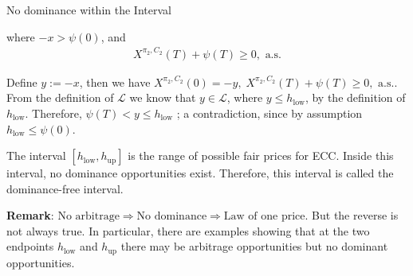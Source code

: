 \documentclass{beamer}
\begin{document}
\begin{frame}{No dominance within the Interval}

    {\footnotesize \footnotesize
    \par where $-x > \psi(0)$, and
    \begin{align*}
        X^{\pi_2, C_2}(T) + \psi(T) \geq 0, \text{ a.s.}
    \end{align*}
    \par Define $y := -x$, then we have $ X^{\pi_2, C_2}(0) = -y, \; X^{\pi_2, C_2}(T) + \psi(T) \geq 0, \text{ a.s.}$. 
    From the definition of $\mathcal{L}$ we know that $y \in \mathcal{L}$, 
    where $y \leq h_{\text{low}}$, by the definition of $h_{\text{low}}$. Therefore, $\psi(T) < y \leq h_{\text{low}}$
    ; a contradiction, since by assumption $h_{\text{low}} \leq \psi(0)$.
    \vspace{1em}
    \par The interval $[h_{\text{low}}, h_{\text{up}}]$ is the  range of possible fair prices  for ECC. 
    Inside this interval, no dominance opportunities exist. Therefore, this interval is called the dominance-free interval.
    \vspace{1em}
    \par \textbf{Remark}: $\text{No arbitrage} \Rightarrow \text{No dominance} \Rightarrow \text{Law of one price}$.
    But the reverse is not always true. In particular, 
    there are examples showing that at the two endpoints $h_{\text{low}}$ and $h_{\text{up}}$ 
    there may be arbitrage opportunities but no dominant opportunities.

    }

\end{frame} 
\end{document}
